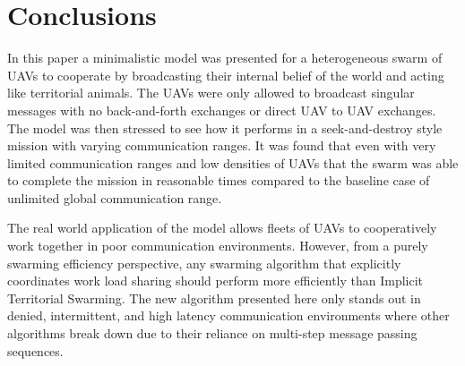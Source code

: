 \chapter{Conclusions}
\label{chap:conclusion}

In this paper a minimalistic model was presented for a heterogeneous swarm of UAVs to cooperate by broadcasting their internal belief of the world and acting like territorial animals.  The UAVs were only allowed to broadcast singular messages with no back-and-forth exchanges or direct UAV to UAV exchanges.  The model was then stressed to see how it performs in a seek-and-destroy style mission with varying communication ranges.  It was found that even with very limited communication ranges and low densities of UAVs that the swarm was able to complete the mission in reasonable times compared to the baseline case of unlimited global communication range.

The real world application of the model allows fleets of UAVs to cooperatively work together in poor communication environments.  However, from a purely swarming efficiency perspective, any swarming algorithm that explicitly coordinates work load sharing should perform more efficiently than Implicit Territorial Swarming.  The new algorithm presented here only stands out in denied, intermittent, and high latency communication environments where other algorithms break down due to their reliance on multi-step message passing sequences.





